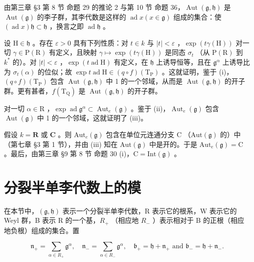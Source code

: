 由第三章 §3 第 8 节 命题 29 的推论 2 与第 10 节 命题 36，\(\operatorname{Aut}(\mathfrak{g}, \mathfrak{h})\) 是 \(\operatorname{Aut}(\mathfrak{g})\) 的李子群，其李代数是这样的 \(\operatorname{ad} x (x \in \mathfrak{g})\) 组成的集合：使 \((\operatorname{ad} x) \mathfrak{h} \subset \mathfrak{h}\) ，换言之即 \(\operatorname{ad} \mathfrak{h}\) 。

设 \(\mathrm{H} \in \mathfrak{h}\) 。存在 \(\varepsilon > 0\) 具有下列性质：对 \(t \in k\) 与 \(|t| < \varepsilon\) ，\(\exp(t\gamma(\mathrm{H}))\) 对一切 \(\gamma \in \mathrm{P}(\mathrm{R})\) 有定义，且映射 \(\gamma \mapsto \exp(t\gamma(\mathrm{H}))\) 是同态 \(\sigma_t\) （从 \(\mathrm{P}(\mathrm{R})\) 到 \(k^*\) 的）。对 \(|t| < \varepsilon\) ，\(\exp(t\operatorname{ad}\mathrm{H})\) 有定义，在 \(\mathfrak{h}\) 上诱导恒等，且在 \(\mathfrak{g}^\alpha\) 上诱导比为 \(\sigma_t(\alpha)\) 的位似；故 \(\exp t\operatorname{ad}\mathrm{H} \in (q \circ f)(\mathrm{T}_{\mathrm{P}})\) 。这就证明，鉴于 (i)，\((q \circ f)(\mathrm{T}_{\mathrm{P}})\) 包含 \(\operatorname{Aut}(\mathfrak{g},\mathfrak{h})\) 中 1 的一个邻域，从而是 \(\operatorname{Aut}(\mathfrak{g},\mathfrak{h})\) 的开子群。更有甚者，\(f(\mathrm{T}_{\mathrm{Q}})\) 是 \(\operatorname{Aut}(\mathfrak{g},\mathfrak{h})\) 的开子群。

对一切 \(\alpha \in \mathrm{R}\) ，\(\exp \operatorname{ad} \mathfrak{g}^{\alpha} \subset \operatorname{Aut}_{e}(\mathfrak{g})\) 。鉴于 (ii)，\(\operatorname{Aut}_{e}(\mathfrak{g})\) 包含 \(\operatorname{Aut}(\mathfrak{g})\) 中 1 的一个邻域，这就证明了 (iii)。

假设 \(k = \mathbf{R}\) 或 \(\mathbf{C}\) 。则 \(\mathrm{Aut}_e(\mathfrak{g})\) 包含在单位元连通分支 \(\mathrm{C}\) （\(\mathrm{Aut}(\mathfrak{g})\) 的）中（第七章 §3 第 1 节），并由 (iii) 知在 \(\mathrm{Aut}(\mathfrak{g})\) 中是开的。于是 \(\mathrm{Aut}_e(\mathfrak{g}) = \mathrm{C}\) 。最后，由第三章 §9 第 8 节 命题 30 (i)，\(\mathrm{C} = \mathrm{Int}(\mathfrak{g})\) 。

\section{分裂半单李代数上的模}

在本节中，\((\mathfrak{g},\mathfrak{h})\) 表示一个分裂半单李代数，R 表示它的根系，W 表示它的 Weyl 群，B 表示 R 的一个基，\(R_{+}\) （相应地 \(R_{-}\) ）表示相对于 B 的正根（相应地负根）组成的集合。置

\[
\mathfrak {n} _ {+} = \sum_ {\alpha \in R _ {+}} \mathfrak {g} ^ {\alpha}, \quad \mathfrak {n} _ {-} = \sum_ {\alpha \in R _ {-}} \mathfrak {g} ^ {\alpha}, \quad \mathfrak {b} _ {+} = \mathfrak {h} + \mathfrak {n} _ {+} \text {   and   } \mathfrak {b} _ {-} = \mathfrak {h} + \mathfrak {n} _ {-}.
\]

